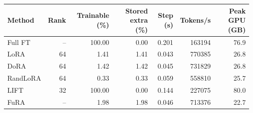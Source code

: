 \begin{tabular}{lrrrrrr}
\toprule
Method & Rank & Trainable (\%) & Stored extra (\%) & Step (s) & Tokens/s & Peak GPU (GB) \\
\midrule
Full FT & -- & 100.00 & 0.00 & 0.201 & 163194 & 76.9 \\
LoRA & 64 & 1.41 & 1.41 & 0.043 & 770385 & 26.8 \\
DoRA & 64 & 1.42 & 1.42 & 0.045 & 731829 & 26.8 \\
RandLoRA & 64 & 0.33 & 0.33 & 0.059 & 558810 & 25.7 \\
LIFT & 32 & 100.00 & 0.00 & 0.144 & 227075 & 80.0 \\
FuRA & -- & 1.98 & 1.98 & 0.046 & 713376 & 22.7 \\
\bottomrule
\end{tabular}
